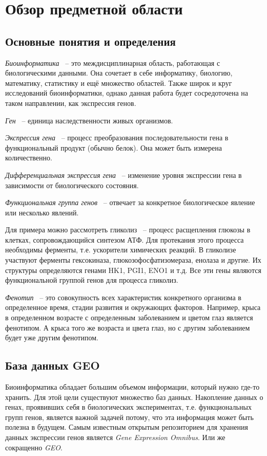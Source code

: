 \documentclass[times,specification,annotation]{itmo-student-thesis}
\begin{document}
\chapter{Обзор предметной области}

\section{Основные понятия и определения}
\startrelatedwork
\textit{Биоинформатика} ~-- это междисциплинарная область, работающая с биологическими данными. Она сочетает в себе информатику, биологию, математику, статистику и ещё множество областей. Также широк и круг исследований биоинформатики, однако данная работа будет сосредоточена на таком направлении, как экспрессия генов.

\textit{Ген} ~-- единица наследственности живых организмов.

\textit{Экспрессия гена} ~-- процесс преобразования последовательности гена в функциональный продукт (обычно белок). Она может быть измерена количественно. 

\textit{Дифференциальная экспрессия гена} ~-- изменение уровня экспрессии гена в зависимости от биологического состояния.

\textit{Функциональная группа генов} ~-- отвечает за конкретное биологическое явление или несколько явлений. 

Для примера можно рассмотреть гликолиз ~-- процесс расщепления глюкозы в клетках, сопровождающийся синтезом АТФ. Для протекания этого процесса необходимы ферменты, т.е. ускорители химических реакций. В гликолизе участвуют ферменты гексокиназа, глюкозофосфатизомераза, енолаза и другие. Их структуры определяются генами HK1, PGI1, ENO1 и т.д.\cite{Glycolysis} Все эти гены являются функциональной группой генов для процесса гликолиз.

\textit{Фенотип} ~-- это совокупность всех характеристик конкретного организма в определенное время, стадии развития и окружающих факторов. Например, крыса в определенном возрасте с определенным заболеванием и цветом глаз является фенотипом. А крыса того же возраста и цвета глаз, но с другим заболеванием будет уже другим фенотипом. 

\section{База данных GEO}

Биоинформатика обладает большим объемом информации, который нужно где-то хранить. Для этой цели существуют множество баз данных. Накопление данных о генах, проявивших себя в биологических экспериментах, т.е. функциональных групп генов, является важной задачей потому, что эта информация может быть полезна в будущем. Самым известным открытым репозиторием для хранения данных экспрессии генов является \textit{Gene Expression Omnibus}. Или же сокращенно \textit{GEO}.
\end{document}
